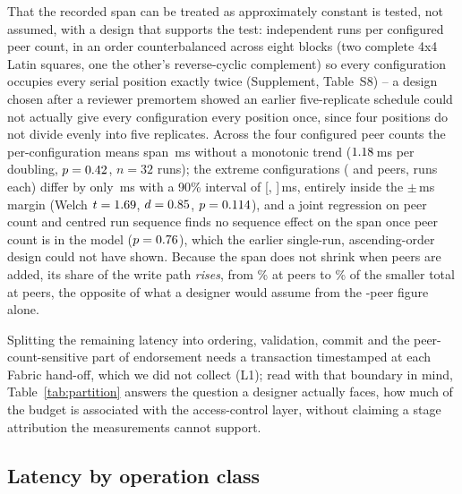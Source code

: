\documentclass[a4paper,fleqn]{cas-sc}
\begin{document}
That the recorded span can be treated as approximately constant is tested,
not assumed, with a design that supports the test: \PartRunsPerConfig{}
independent runs per configured peer count, in an order counterbalanced
across eight blocks (two complete 4x4 Latin squares, one the other's
reverse-cyclic complement) so every configuration occupies every serial
position exactly twice (Supplement, Table~S8) -- a design chosen after a
reviewer premortem showed an earlier five-replicate schedule could not
actually give every configuration every position once, since four
positions do not divide evenly into five replicates. Across the four
configured peer counts the per-configuration means span \PartSpread\,ms
without a monotonic trend ($1.18$\,ms per doubling,
$p=0.42$, $n=32$ runs); the extreme configurations (\ScaleMinPeers{}
and \ScaleMaxPeers{} peers, \PartRunsPerConfig{} runs each) differ by only
\PartTostDiff\,ms with a 90\% interval of [\PartTostLow,
\PartTostHigh]\,ms, entirely inside the $\pm$\DecisionMargin\,ms margin
(Welch $t=1.69$, $d=0.85$, $p=0.114$), and a
joint regression on peer count and centred run sequence finds no sequence
effect on the span once peer count is in the model
($p=0.76$), which the earlier single-run, ascending-order
design could not have shown. Because the span does not shrink when peers
are added, its share of the write path \emph{rises}, from
\PartAccessPct\% at \ScaleMinPeers{} peers to \PartAccessPctAtMax\% of the
smaller total at \ScaleMaxPeers{} peers, the opposite of what a designer
would assume from the \ScaleMinPeers-peer figure alone.

Splitting the remaining latency into ordering, validation, commit and the
peer-count-sensitive part of endorsement needs a transaction timestamped at
each Fabric hand-off, which we did not collect (L1); read with that
boundary in mind, Table~\ref{tab:partition} answers the question a designer
actually faces, how much of the budget is associated with the
access-control layer, without claiming a stage attribution the
measurements cannot support.

\subsection{Latency by operation class}
\label{subsec:byclass}
\end{document}
